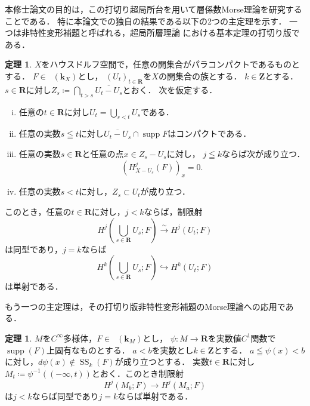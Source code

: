 ﻿\documentclass[a4paper]{jsarticle}
\theoremstyle{definition}
\newcommand{\zz}{\mathbf{Z}}
\newcommand{\rr}{\mathbf{R}}
\newcommand{\kk}{\mathbf{k}}
\numberwithin{equation}{section}
\newcommand{\supp}{\mathop{\mathrm{supp}}\nolimits}
\newcommand{\Dompl}{\mathop{\mathsf{D}^\mathrm{+}}\nolimits}
\newcommand{\Dompb}{\mathop{\mathsf{D}^\mathrm{b}}\nolimits}
\newcommand{\muS}[1][]{\mathop{\mathrm{SS}}\nolimits_{#1}}
\newcommand{\simar}{\mathrel{\overset{\sim}{\rightarrow}}}%
\theoremstyle{mystyle}
\newtheorem{THM}[AXM]{定理}
\newcommand{\smi}{-}
\begin{document}
\begin{gaiyo}
  本修士論文の目的は，この打切り超局所台を用いて層係数Morse理論を研究することである．
  特に本論文での独自の結果である以下の2つの主定理を示す．
  一つは非特性変形補題と呼ばれる，超局所層理論
  における基本定理の打切り版である．
  \begin{THM}
    \(X\)をハウスドルフ空間で，任意の開集合がパラコンパクトであるものとする．
    \(F\in\Dompl(\kk_X)\)とし，
    \(\left(U_{t}\right)_{t\in\rr}\)を\(X\)の開集合の族とする．
    \(k\in\zz\)とする．
    \(s\in\rr\)に対し\(
      Z_{s}\coloneqq \bigcap_{t>s}\overline{U_t\smi U_s}
    \)とおく．
    次を仮定する．
    \begin{enumerate}[(i)]
      \item \label{item:t-nonchar1}
      任意の\(t\in\rr\)に対し\(U_{t}=\bigcup_{s<t}U_{s}\)である．
      \item \label{item:t-nonchar2}
      任意の実数\(s\leqq t\)に対し\(
        \overline{U_{t}\smi U_{s}}\cap \supp{F}
      \)はコンパクトである．
      \item \label{item:t-nonchar3}
      任意の実数\(s\in\rr\)と任意の点\(x\in Z_{s}\smi U_{s}\)に対し，
      \(j\leqq k\)ならば次が成り立つ．
      \[
        (H^{j}_{X\smi U_{s}}(F))_{x}=0. 
      \]
      \item \label{item:t-nonchar4} 
      任意の実数\(s< t\)に対し，\(Z_s\subset U_{t}\)が成り立つ．
    \end{enumerate}
    このとき，任意の\(t\in\rr\)に対し，\(j<k\)ならば，制限射\[
      H^{j}\left(\bigcup_{s\in\rr}U_{s};F\right)
      \simar 
      H^{j}\left(U_{t};F\right)
    \]は同型であり，\(j=k\)ならば\[
      H^{k}\left(\bigcup_{s\in\rr}U_{s};F\right)
      \hookrightarrow 
      H^{k}\left(U_{t};F\right)
    \]は単射である．
  \end{THM}
  もう一つの主定理は，その打切り版非特性変形補題のMorse理論への応用である．
  \begin{THM}\label{thm:t-morse}
    \(M\)を\(C^{\infty}\)多様体，\(F\in\Dompb(\kk_M)\)とし，
    \(\psi\colon M\to \rr\)を実数値\(C^1\)関数で
    \(\supp(F)\)上固有なものとする．
    \(a<b\)を実数とし\(k\in\zz\)とする．
    \(
      a\leqq \psi(x)<b
    \)に対し，\(d\psi(x)\notin \muS[k](F)\)が成り立つとする．
    実数\(t\in \rr\)に対し\(
      M_t\coloneqq\psi^{-1}\left((-\infty,t)\right)
    \)とおく．このとき制限射
    \[
      H^{j}(M_{b};F)\to H^{j}(M_{a};F)
    \]
    は\(j< k\)ならば同型であり\(j=k\)ならば単射である．
  \end{THM}


\end{gaiyo}
\end{document}
